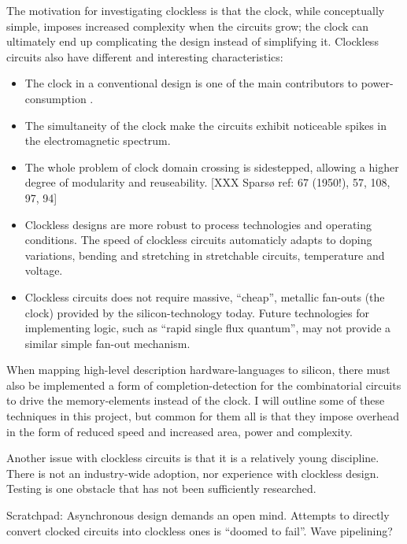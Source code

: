 The motivation for investigating clockless is that the clock, while
conceptually simple, imposes increased complexity when the circuits
grow; the clock can ultimately end up complicating the design instead
of simplifying it. Clockless circuits also have different and
interesting characteristics: \begin{itemize}

\item The clock in a conventional design is one of the main
  contributors to power-consumption \cite{tiwari1998reducing}.

\item The simultaneity of the clock make the circuits exhibit
  noticeable spikes in the electromagnetic spectrum.

\item The whole problem of clock domain crossing is sidestepped,
  allowing a higher degree of modularity and reuseability. [XXX Sparsø
    ref: 67 (1950!), 57, 108, 97, 94]

\item Clockless designs are more robust to process technologies and
  operating conditions. The speed of clockless circuits automaticly
  adapts to doping variations, bending and stretching in stretchable
  circuits, temperature and voltage.

\item Clockless circuits does not require massive, ``cheap'', metallic
  fan-outs (the clock) provided by the silicon-technology today. Future
  technologies for implementing logic, such as ``rapid single flux
  quantum'', may not provide a similar simple fan-out mechanism.
\end{itemize}

When mapping high-level description hardware-languages to silicon,
there must also be implemented a form of completion-detection for the
combinatorial circuits to drive the memory-elements instead of the
clock. I will outline some of these techniques in this project, but
common for them all is that they impose overhead in the form of
reduced speed and increased area, power and complexity.

Another issue with clockless circuits is that it is a relatively young
discipline. There is not an industry-wide adoption, nor experience
with clockless design. Testing is one obstacle that has not been
sufficiently researched. 

Scratchpad: Asynchronous design demands an open mind. Attempts to
directly convert clocked circuits into clockless ones is ``doomed to
fail''. Wave pipelining?
